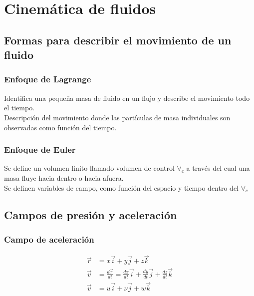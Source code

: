 \section{Cinemática de fluidos}

\subsection{Formas para describir el movimiento de un fluido}

\subsubsection{Enfoque de Lagrange}

Identifica una pequeña masa de fluido en un flujo y describe el movimiento todo el tiempo. \\
Descripción del movimiento donde las  partículas de masa individuales son observadas como función del tiempo. 


\subsubsection{Enfoque de Euler}

Se define un volumen finito llamado volumen de control \( \forall_{c} \) a través del cual una masa fluye hacia dentro o hacia afuera. \\
Se definen variables de campo, como función del espacio y tiempo dentro del \( \forall_{c} \)

\subsection{Campos de presión y aceleración}

\subsubsection{Campo de aceleración}


\[
    \begin{split}
        \Vec{r} & = x \Vec{i} + y \Vec{j} + z \Vec{k} \\
        \Vec{v} & = \frac{ d\Vec{r} }{ dt } = \frac{ dx }{ dt } \Vec{i} + \frac{ dy }{ dt } \Vec{j} + \frac{ dz }{ dt } \Vec{k} \\
        \Vec{v} & = u \Vec{i} + \nu \Vec{j} + w \Vec{k}
    \end{split}
\]

